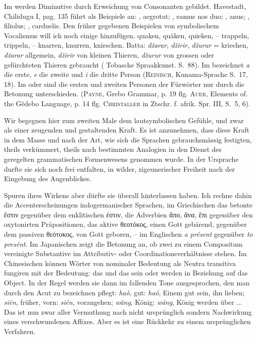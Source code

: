 Im  werden Diminutive durch Erweichung von Consonanten gebildet. Havestadt, Chilidugu I, pag. 135 führt als Beispiele an: , aegrotat; , eamus nos duo; , anus; , filiolus; , carduelis. Den früher gegebenen Beispielen von symbolischem Vocalismus will ich noch einige hinzufügen.  quaken, quäken, quieken, – trappeln, trippeln, – knarren, knurren, knirschen. Batta: \textit{džarar}, \textit{džirir}, \textit{džurur} = kriechen, \textit{džarar} allgemein, \textit{džirir} von kleinen Thieren, \textit{džurur} von grossen oder gefürchteten Thieren gebraucht ( Tobasche Spraakkunst. S.~88). Im  bezeichnet \textit{a} die erste, \textit{e} die zweite und \textit{i} die dritte Person (\textsc{Reinisch}, Kunama-Sprache S.~17, 18). Im  oder  sind die ersten und zweiten Personen der Fürwörter nur durch die Betonung unterschieden. (\textsc{Payne}, Grebo Grammar, p. 19 flg. \textsc{Auer}, Elements of. the Gĕdebo Language, p. 14 flg. \textsc{Christaller} in Ztschr. f. afrik. Spr. III, S.~5, 6).

\largerpage[1]Wir begegnen hier zum zweiten Male dem lautsymbolischen Gefühle, und zwar als einer zeugenden und gestaltenden Kraft. Es ist anzunehmen, dass diese Kraft in dem Masse und nach der Art, wie sich die Sprachen gebrauchsmässig festigten, theils verkümmert, theils nach bestimmten Analogien in den Dienst des geregelten  grammatischen Formenwesens genommen wurde. In der Ursprache durfte sie sich noch frei entfalten, in wilder, zigeunerischer Freiheit nach der Eingebung des Augenblickes.

Spuren ihres Wirkens aber dürfte sie überall hinterlassen haben. Ich rechne dahin die Accenterscheinungen indogermanischer Sprachen, im Griechischen das betonte ἔστιν gegenüber dem enklitischen ἐστιν, die Adverbien ἄπο, ἄνα, ἔπι gegenüber den oxytonirten Präpositionen, das aktive θεοτόκος, einen Gott gebärend, gegenüber dem passiven θεότοκος, von Gott geboren, – im Englischen \textit{a présent} gegenüber \textit{to} \label{fp.364} \textit{presént}. Im Japanischen zeigt die Betonung an, ob zwei zu einem Compositum vereinigte Substantive im Attributiv- oder Coordinationsverhältnisse  stehen. Im Chinesischen können Wörter von nominaler Bedeutung als Neutra transitiva fungiren mit der Bedeutung: das und das sein oder werden in Beziehung auf das Object. In der Regel werden sie dann im fallenden Tone ausgesprochen, den man durch den Acut zu bezeichnen pflegt: \textit{haò}, gut: \textit{haó}, Einem gut sein, ihn lieben; \textit{siēn}, früher, vorn: \textit{sién}, vorangehen; \textit{wâng}, König: \textit{wáng}, König werden über ... Das ist nun zwar aller Vermuthung nach nicht ursprünglich sondern Nachwirkung eines verschwundenen Affixes. Aber es ist eine Rückkehr zu einem ursprünglichen Verfahren.


